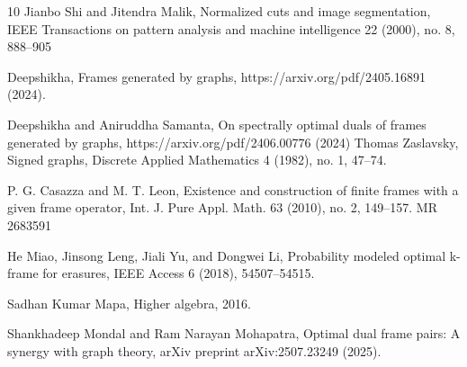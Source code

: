 \documentclass[final,1p,times]{elsarticle}
\begin{document}
\begin{thebibliography}{10}
 Jianbo Shi and Jitendra Malik, Normalized cuts and image segmentation, IEEE Transactions on pattern analysis and machine intelligence 22 (2000), no. 8, 888–905


  Deepshikha, Frames generated by graphs, https://arxiv.org/pdf/2405.16891 (2024).

Deepshikha and Aniruddha Samanta, On spectrally optimal duals of frames generated by graphs,
https://arxiv.org/pdf/2406.00776 (2024)
Thomas Zaslavsky, Signed graphs, Discrete Applied Mathematics 4 (1982), no. 1, 47–74.

 P. G. Casazza and M. T. Leon, Existence and construction of finite frames with a given frame operator, Int. J. Pure
Appl. Math. 63 (2010), no. 2, 149–157. MR 2683591	

He Miao, Jinsong Leng, Jiali Yu, and Dongwei Li, Probability modeled optimal k-frame for erasures, IEEE Access
6 (2018), 54507–54515.

Sadhan Kumar Mapa, Higher algebra, 2016.

 Shankhadeep Mondal and Ram Narayan Mohapatra, Optimal dual frame pairs: A synergy with graph theory, arXiv
preprint arXiv:2507.23249 (2025).

\end{thebibliography}	
	
	
	
\end{document}
